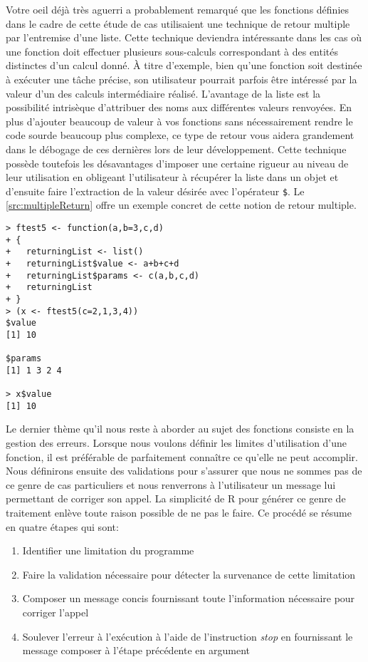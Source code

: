 \vspace{\baselineskip}
\noindent
Votre oeil déjà très aguerri a probablement remarqué que les fonctions définies dans le cadre de cette étude de cas utilisaient une technique de retour multiple par l'entremise d'une liste. Cette technique deviendra intéressante dans les cas où une fonction doit effectuer plusieurs sous-calculs correspondant à des entités distinctes d'un calcul donné. À titre d'exemple, bien qu'une fonction soit destinée à exécuter une tâche précise, son utilisateur pourrait parfois être intéressé par la valeur d'un des calculs intermédiaire réalisé. L'avantage de la liste est la possibilité intrisèque d'attribuer des noms aux différentes valeurs renvoyées. En plus d'ajouter beaucoup de valeur à vos fonctions sans nécessairement rendre le code sourde beaucoup plus complexe, ce type de retour vous aidera grandement dans le débogage de ces dernières lors de leur développement. Cette technique possède toutefois les désavantages d'imposer une certaine rigueur au niveau de leur utilisation en obligeant l'utilisateur à récupérer la liste dans un objet et d'ensuite faire l'extraction de la valeur désirée avec l'opérateur \texttt{\$}. Le \autoref{src:multipleReturn} offre un exemple concret de cette notion de retour multiple.

\begin{lstlisting}[caption = Retour multiple par l'entremise d'une liste,label=src:multipleReturn]
> ftest5 <- function(a,b=3,c,d)
+ {
+   returningList <- list()
+   returningList$value <- a+b+c+d
+   returningList$params <- c(a,b,c,d)
+   returningList
+ }
> (x <- ftest5(c=2,1,3,4))
$value
[1] 10

$params
[1] 1 3 2 4

> x$value
[1] 10
\end{lstlisting}

\vspace{\baselineskip}
\noindent
Le dernier thème qu'il nous reste à aborder au sujet des fonctions consiste en la gestion des erreurs. Lorsque nous voulons définir les limites d'utilisation d'une fonction, il est préférable de parfaitement connaître ce qu'elle ne peut accomplir. Nous définirons ensuite des validations pour s'assurer que nous ne sommes pas de ce genre de cas particuliers et nous renverrons à l'utilisateur un message lui permettant de corriger son appel. La simplicité de R pour générer ce genre de traitement enlève toute raison possible de ne pas le faire. Ce procédé se résume en quatre étapes qui sont:
\begin{enumerate}
	\item Identifier une limitation du programme
	\item Faire la validation nécessaire pour détecter la survenance de cette limitation
	\item Composer un message concis fournissant toute l'information nécessaire pour corriger l'appel
	\item Soulever l'erreur à l'exécution à l'aide de l'instruction \emph{stop} en fournissant le message composer à l'étape précédente en argument
\end{enumerate}

